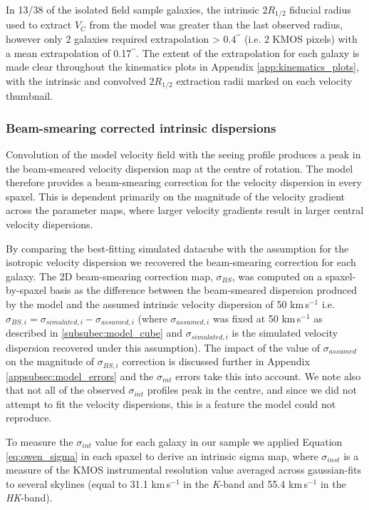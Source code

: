 \documentclass[fleqn,usenatbib]{mnras}
\begin{document}
\noindent
In 13/38 of the isolated field sample galaxies, the intrinsic $2R_{1/2}$ fiducial radius used to extract $V_{C}$ from the model was greater than the last observed radius, however only 2 galaxies required extrapolation > 0.4$^{\prime\prime}$ (i.e. 2 KMOS pixels) with a mean extrapolation of 0.17$^{\prime\prime}$.
The extent of the extrapolation for each galaxy is made clear throughout the kinematics plots in Appendix \ref{app:kinematics_plots}, with the intrinsic and convolved $2R_{1/2}$ extraction radii marked on each velocity thumbnail.

\subsubsection{Beam-smearing corrected intrinsic dispersions}\label{subsubsec:beam_smearing_corrected_dispersions}
Convolution of the model velocity field with the seeing profile produces a peak in the beam-smeared velocity dispersion map at the centre of rotation.
The model therefore provides a beam-smearing correction for the velocity dispersion in every spaxel.
This is dependent primarily on the magnitude of the velocity gradient across the parameter maps, where larger velocity gradients result in larger central velocity dispersions.

By comparing the best-fitting simulated datacube with the assumption for the isotropic velocity dispersion we recovered the beam-smearing correction for each galaxy.
The 2D beam-smearing correction map, $\sigma_{BS}$, was computed on a spaxel-by-spaxel basis as the difference between the beam-smeared dispersion produced by the model and the assumed intrinsic velocity dispersion of 50 km\,s$^{-1}$ i.e. $\sigma_{BS,i} = \sigma_{simulated,i} - \sigma_{assumed,i}$ (where $\sigma_{assumed,i}$ was fixed at 50 km\,s$^{-1}$ as described in \cref{subsubec:model_cube} and $\sigma_{simulated,i}$ is the simulated velocity dispersion recovered under this assumption).
The impact of the value of $\sigma_{assumed}$ on the magnitude of $\sigma_{BS,i}$ correction is discussed further in Appendix \ref{appsubsec:model_errors} and the $\sigma_{int}$ errors take this into account.
We note also that not all of the observed $\sigma_{int}$ profiles peak in the centre, and since we did not attempt to fit the velocity dispersions, this is a feature the model could not reproduce. 

To measure the $\sigma_{int}$ value for each galaxy in our sample we applied Equation \ref{eq:owen_sigma} in each spaxel to derive an intrinsic sigma map, where $\sigma_{inst}$ is a measure of the KMOS instrumental resolution value averaged across gaussian-fits to several skylines (equal to 31.1 km\,s$^{-1}$ in the {\it K}-band and 55.4 km\,s$^{-1}$ in the {\it HK}-band).
\end{document}
